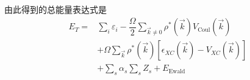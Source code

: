 {由此得到的总能量表达式是
\begin{equation}
	\begin{aligned}
		E_T=&\sum_i\varepsilon_i-\dfrac{\Omega}2\sum_{\vec k\neq0}\rho^{\ast}(\vec k)V_{\mathrm{Coul}}(\vec k)\\
		&+\Omega\sum_{\vec k}\rho^{\ast}(\vec k)[\epsilon_{XC}(\vec k)-V_{XC}(\vec k)]\\
		&+\sum_s\alpha_s\sum_sZ_s+E_{\mathrm{Ewald}}
	\end{aligned}
\end{equation}

}
